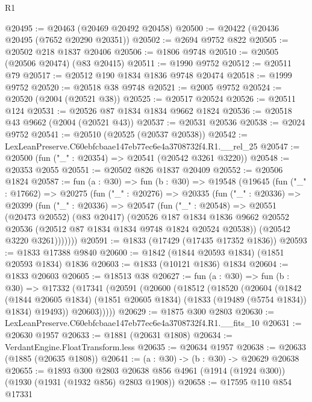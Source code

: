 \begin{lexlean}{R1}
\begin{coremodule}
@20495 := @20463 (@20469 @20492 @20458)
@20500 := @20422 (@20436 @20495 (@7652 @20290 @20351))
@20502 := @2694 @9752 @822
@20505 := @20502 @218 @1837 @20406
@20506 := @1806 @9748
@20510 := @20505 (@20506 @20474) (@83 @20415)
@20511 := @1990 @9752
@20512 := @20511 @79
@20517 := @20512 @190 @1834 @1836 @9748 @20474
@20518 := @1999 @9752
@20520 := @20518 @38 @9748
@20521 := @2005 @9752
@20524 := @20520 (@2004 (@20521 @38))
@20525 := @20517 @20524
@20526 := @20511 @124
@20531 := @20526 @87 @1834 @1834 @9662 @1824
@20536 := @20518 @43 @9662 (@2004 (@20521 @43))
@20537 := @20531 @20536
@20538 := @2024 @9752
@20541 := @20510 (@20525 (@20537 @20538))
@20542 := LexLeanPreserve.C60ebfcbaae147eb77ec6e4a3708732f4.R1.__rel_25
@20547 := @20500 (fun ("_" : @20354) => @20541 (@20542 @3261 @3220))
@20548 := @20353 @2055
@20551 := @20502 @826 @1837 @20409
@20552 := @20506 @1824
@20587 := fun (a : @30) =>
  fun (b : @30) =>
  @19548
    (@19645
      (fun ("_" : @17662) =>
      @20275
        (fun ("_" : @20276) =>
        @20335
          (fun ("_" : @20336) =>
          @20399
            (fun ("_" : @20336) =>
            @20547
              (fun ("_" : @20548) =>
              @20551
                (@20473 @20552)
                (@83 @20417)
                (@20526
                  @187
                  @1834
                  @1836
                  @9662
                  @20552
                  @20536
                  (@20512 @87 @1834 @1834 @9748 @1824 @20524 @20538))
                (@20542 @3220 @3261)))))))
@20591 := @1833 (@17429 (@17435 @17352 @1836))
@20593 := @1833 @17388 @9840
@20600 := @1842 (@1844 @20593 @1834) (@1851 @20593 @1834) @1836
@20603 := @1833 (@10121 @1836) @1834
@20604 := @1833 @20603
@20605 := @18513 @38
@20627 := fun (a : @30) =>
  fun (b : @30) =>
  @17332
    (@17341
      (@20591
        (@20600
          (@18512
            (@18520
              (@20604
                (@1842
                  (@1844 @20605 @1834)
                  (@1851 @20605 @1834)
                  (@1833 (@19489 (@5754 @1834)) @1834)
                  @19493))
              @20603)))))
@20629 := @1875 @300 @2803
@20630 := LexLeanPreserve.C60ebfcbaae147eb77ec6e4a3708732f4.R1.__fits_10
@20631 := @20630 @1957
@20633 := @1881 (@20631 @1808)
@20634 := VerdantEngine.FloatTransform.less
@20635 := @20634 @1957
@20638 := @20633 (@1885 (@20635 @1808))
@20641 := (a : @30) -> (b : @30) -> @20629 @20638
@20655 := @1893
    @300
    @2803
    @20638
    @856
    @4961
    (@1914 (@1924 @300))
    (@1930 (@1931 (@1932 @856) @2803 @1908))
@20658 := @17595 @110 @854 @17331

\end{coremodule}
\end{lexlean}
